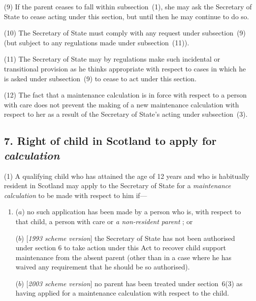 \documentclass[12pt,a4paper]{article}
\begin{document}
(9) If the parent ceases to fall within subsection~(1), she may ask the Secretary of State to cease acting under this section, but until then he may continue to do so.

(10) The Secretary of State must comply with any request under subsection~(9)  (but subject to any regulations made under subsection~(11)).

(11) The Secretary of State may by regulations make such incidental or transitional provision as he thinks appropriate with respect to cases in which he is asked under subsection~(9)  to cease to act under this section.

(12) The fact that a maintenance calculation is in force with respect to a person with care does not prevent the making of a new maintenance calculation with respect to her as a result of the Secretary of State’s acting under subsection~(3).


\subsection{7. Right of child in Scotland to apply for 
\emph{calculation}  %
}

(1) A qualifying child who has attained the age of 12 years and who is habitually resident in Scotland may apply to the Secretary of State for a 
\emph{maintenance calculation}  %
to be made with respect to him if—
\begin{enumerate}\item[]
($a$) no such application has been made by a person who is, with respect to that child, a person with care or 
\emph{a non-resident parent}%
; or

($b$) [\emph{1993 scheme version}] the Secretary of State has not been authorised under section 6 to take action under this Act to recover child support maintenance from the absent parent (other than in a case where he has waived any requirement that he should be so authorised).

($b$) [\emph{2003 scheme version}] no parent has been treated under section~6(3)  as having applied for a maintenance calculation with respect to the child.
\end{enumerate}
\end{document}
